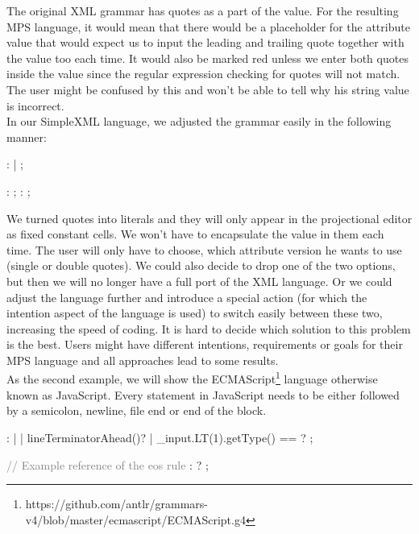 The original XML grammar has quotes as a part of the value.
For the resulting MPS language, it would mean that there would be a placeholder for the attribute value that would expect us to input the leading and trailing quote together with the value too each time.
It would also be marked red unless we enter both quotes inside the value since the regular expression checking for quotes will not match.
The user might be confused by this and won't be able to tell why his string value is incorrect.
\\

In our SimpleXML language, we adjusted the grammar easily in the following manner:

\begin{antlr}
	   :      
	            |      
	            ;

	       :   \regex{~["]*} ;
	       :   \regex{~[']*} ;
\end{antlr}

We turned quotes into literals and they will only appear in the projectional editor as fixed constant cells.
We won't have to encapsulate the value in them each time.
The user will only have to choose, which attribute version he wants to use (single or double quotes).
We could also decide to drop one of the two options, but then we will no longer have a full port of the XML language.
Or we could adjust the language further and introduce a special action (for which the intention aspect of the language is used) to switch easily between these two, increasing the speed of coding.
It is hard to decide which solution to this problem is the best.
Users might have different intentions, requirements or goals for their MPS language and all approaches lead to some results.
\\

As the second example, we will show the ECMAScript\footnote{https://github.com/antlr/grammars-v4/blob/master/ecmascript/ECMAScript.g4} language otherwise known as JavaScript.
Every statement in JavaScript needs to be either followed by a semicolon, newline, file end or end of the block.

\begin{antlr}
	            : 
	               | 
	               | {lineTerminatorAhead()}?
	               | {{\_}input.LT(1).getType() == }?
	               ;

	\textcolor{gray}{// Example reference of the eos rule}
	 :  ? 
	               ;
\end{antlr}

